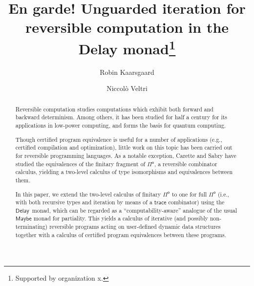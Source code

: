\documentclass[runningheads,a4paper]{llncs}
\newcommand{\Pio}{\ensuremath{\mathsf{\Pi}^{\mathsf{o}}}}
\newcommand{\trace}{\ensuremath{\mathsf{trace}}}
\newcommand{\Delay}{\ensuremath{\mathsf{Delay}\,}}
\begin{document}
%
\title{En garde! Unguarded iteration for reversible computation in the Delay monad\thanks{Supported by organization x.}}
%
%
\author{Robin Kaarsgaard  \and
Niccol\`o Veltri}
%
%
%
\maketitle              %
%
\begin{abstract}
Reversible computation studies computations which exhibit both forward and
backward determinism. Among others, it has been studied for half a century for
its applications in low-power computing, and forms the basis for quantum
computing.

Though certified program equivalence is useful for a number of applications
(e.g., certified compilation and optimization), little work on this topic has
been carried out for reversible programming languages. As a notable exception,
Carette and Sabry have studied the equivalences of the finitary fragment of \Pio, a reversible combinator calculus, yielding a two-level calculus of type isomorphisms and equivalences between them.

In this paper, we extend the two-level calculus of finitary \Pio{} to one for
full \Pio{} (i.e., with both recursive types and iteration by means of a
\trace{} combinator) using the \Delay{} monad, which can be regarded as a
``computability-aware'' analogue of the usual $\mathsf{Maybe}$ monad for
partiality. This yields a calculus of iterative (and possibly non-terminating)
reversible programs acting on user-defined dynamic data structures together
with a calculus of certified program equivalences between these programs.

\end{abstract}
\end{document}
